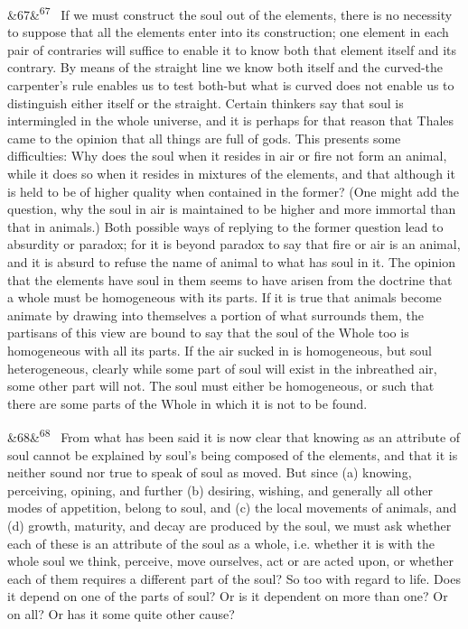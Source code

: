 \documentclass[12pt]{article}
\newcommand{\para}[1][]{\par\noindent\ifx&#1&\else\textsuperscript{\footnotesize #1}~\fi}
\begin{document}
\para[67] If we must construct the soul out of the elements, there is no necessity to suppose that all the elements enter into its construction; one element in each pair of contraries will suffice to enable it to know both that element itself and its contrary. By means of the straight line we know both itself and the curved-the carpenter's rule enables us to test both-but what is curved does not enable us to distinguish either itself or the straight. Certain thinkers say that soul is intermingled in the whole universe, and it is perhaps for that reason that Thales came to the opinion that all things are full of gods. This presents some difficulties: Why does the soul when it resides in air or fire not form an animal, while it does so when it resides in mixtures of the elements, and that although it is held to be of higher quality when contained in the former? (One might add the question, why the soul in air is maintained to be higher and more immortal than that in animals.) Both possible ways of replying to the former question lead to absurdity or paradox; for it is beyond paradox to say that fire or air is an animal, and it is absurd to refuse the name of animal to what has soul in it. The opinion that the elements have soul in them seems to have arisen from the doctrine that a whole must be homogeneous with its parts. If it is true that animals become animate by drawing into themselves a portion of what surrounds them, the partisans of this view are bound to say that the soul of the Whole too is homogeneous with all its parts. If the air sucked in is homogeneous, but soul heterogeneous, clearly while some part of soul will exist in the inbreathed air, some other part will not. The soul must either be homogeneous, or such that there are some parts of the Whole in which it is not to be found.

\para[68] From what has been said it is now clear that knowing as an attribute of soul cannot be explained by soul's being composed of the elements, and that it is neither sound nor true to speak of soul as moved. But since (a) knowing, perceiving, opining, and further (b) desiring, wishing, and generally all other modes of appetition, belong to soul, and (c) the local movements of animals, and (d) growth, maturity, and decay are produced by the soul, we must ask whether each of these is an attribute of the soul as a whole, i.e. whether it is with the whole soul we think, perceive, move ourselves, act or are acted upon, or whether each of them requires a different part of the soul? So too with regard to life. Does it depend on one of the parts of soul? Or is it dependent on more than one? Or on all? Or has it some quite other cause?
\end{document}

